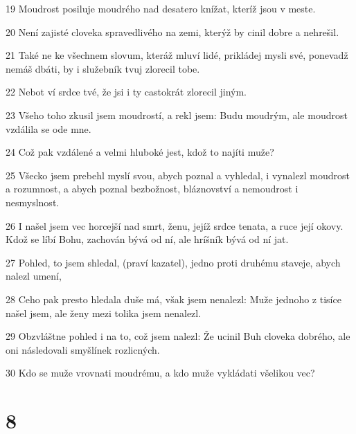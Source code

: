 \par 19 Moudrost posiluje moudrého nad desatero knížat, kteríž jsou v meste.
\par 20 Není zajisté cloveka spravedlivého na zemi, kterýž by cinil dobre a nehrešil.
\par 21 Také ne ke všechnem slovum, kteráž mluví lidé, prikládej mysli své, ponevadž nemáš dbáti, by i služebník tvuj zlorecil tobe.
\par 22 Nebot ví srdce tvé, že jsi i ty castokrát zlorecil jiným.
\par 23 Všeho toho zkusil jsem moudrostí, a rekl jsem: Budu moudrým, ale moudrost vzdálila se ode mne.
\par 24 Což pak vzdálené a velmi hluboké jest, kdož to najíti muže?
\par 25 Všecko jsem prebehl myslí svou, abych poznal a vyhledal, i vynalezl moudrost a rozumnost, a abych poznal bezbožnost, bláznovství a nemoudrost i nesmyslnost.
\par 26 I našel jsem vec horcejší nad smrt, ženu, jejíž srdce tenata, a ruce její okovy. Kdož se líbí Bohu, zachován bývá od ní, ale hríšník bývá od ní jat.
\par 27 Pohled, to jsem shledal, (praví kazatel), jedno proti druhému staveje, abych nalezl umení,
\par 28 Ceho pak presto hledala duše má, však jsem nenalezl: Muže jednoho z tisíce našel jsem, ale ženy mezi tolika jsem nenalezl.
\par 29 Obzvláštne pohled i na to, což jsem nalezl: Že ucinil Buh cloveka dobrého, ale oni následovali smyšlínek rozlicných.
\par 30 Kdo se muže vrovnati moudrému, a kdo muže vykládati všelikou vec?

\chapter{8}

